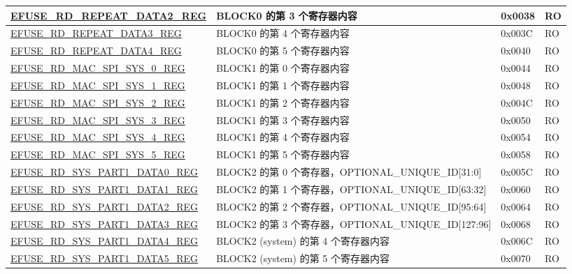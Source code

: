 \begin{longtable}{ | p{6.8cm} | p{7cm} | p{1.3cm} | p{1.2cm} | }
\hyperref[regdesc:EFUSERDREPEATDATA2REG]{EFUSE\_RD\_REPEAT\_DATA2\_REG} & BLOCK0 的第 3 个寄存器内容 & 0x0038 & RO \\ \hline
\hyperref[regdesc:EFUSERDREPEATDATA3REG]{EFUSE\_RD\_REPEAT\_DATA3\_REG} & BLOCK0 的第 4 个寄存器内容 & 0x003C & RO \\ \hline
\hyperref[regdesc:EFUSERDREPEATDATA4REG]{EFUSE\_RD\_REPEAT\_DATA4\_REG} & BLOCK0 的第 5 个寄存器内容 & 0x0040 & RO \\ \hline
\hyperref[regdesc:EFUSERDMACSPISYS0REG]{EFUSE\_RD\_MAC\_SPI\_SYS\_0\_REG} & BLOCK1 的第 0 个寄存器内容 & 0x0044 & RO \\ \hline
\hyperref[regdesc:EFUSERDMACSPISYS1REG]{EFUSE\_RD\_MAC\_SPI\_SYS\_1\_REG} & BLOCK1 的第 1 个寄存器内容 & 0x0048 & RO \\ \hline
\hyperref[regdesc:EFUSERDMACSPISYS2REG]{EFUSE\_RD\_MAC\_SPI\_SYS\_2\_REG} & BLOCK1 的第 2 个寄存器内容 & 0x004C & RO \\ \hline
\hyperref[regdesc:EFUSERDMACSPISYS3REG]{EFUSE\_RD\_MAC\_SPI\_SYS\_3\_REG} & BLOCK1 的第 3 个寄存器内容 & 0x0050 & RO \\ \hline
\hyperref[regdesc:EFUSERDMACSPISYS4REG]{EFUSE\_RD\_MAC\_SPI\_SYS\_4\_REG} & BLOCK1 的第 4 个寄存器内容 & 0x0054 & RO \\ \hline
\hyperref[regdesc:EFUSERDMACSPISYS5REG]{EFUSE\_RD\_MAC\_SPI\_SYS\_5\_REG} & BLOCK1 的第 5 个寄存器内容 & 0x0058 & RO \\ \hline
\hyperref[regdesc:EFUSERDSYSPART1DATA0REG]{EFUSE\_RD\_SYS\_PART1\_DATA0\_REG} & BLOCK2 的第 0 个寄存器，OPTIONAL\_UNIQUE\_ID[31:0] & 0x005C & RO \\ \hline
\hyperref[regdesc:EFUSERDSYSPART1DATA1REG]{EFUSE\_RD\_SYS\_PART1\_DATA1\_REG} & BLOCK2 的第 1 个寄存器，OPTIONAL\_UNIQUE\_ID[63:32] & 0x0060 & RO \\ \hline
\hyperref[regdesc:EFUSERDSYSPART1DATA2REG]{EFUSE\_RD\_SYS\_PART1\_DATA2\_REG} & BLOCK2 的第 2 个寄存器，OPTIONAL\_UNIQUE\_ID[95:64] & 0x0064 & RO \\ \hline
\hyperref[regdesc:EFUSERDSYSPART1DATA3REG]{EFUSE\_RD\_SYS\_PART1\_DATA3\_REG} & BLOCK2 的第 3 个寄存器，OPTIONAL\_UNIQUE\_ID[127:96] & 0x0068 & RO \\ \hline
\hyperref[regdesc:EFUSERDSYSPART1DATA4REG]{EFUSE\_RD\_SYS\_PART1\_DATA4\_REG} & BLOCK2 (system) 的第 4 个寄存器内容 & 0x006C & RO \\ \hline
\hyperref[regdesc:EFUSERDSYSPART1DATA5REG]{EFUSE\_RD\_SYS\_PART1\_DATA5\_REG} & BLOCK2 (system) 的第 5 个寄存器内容 & 0x0070 & RO \\ \hline

\end{longtable}
